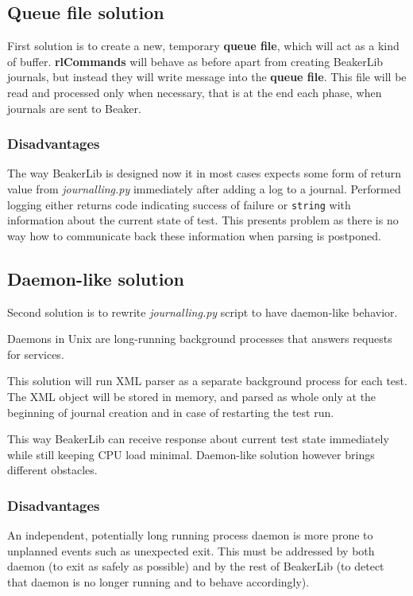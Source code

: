 \subsection{Queue file solution}
First solution is to create a new, temporary \textbf{queue file}, which will act as a kind of buffer. \mbox{\textbf{rlCommands}} will behave as before apart from creating BeakerLib journals, but instead they will write message into the \textbf{queue file}. This file will be read and processed only when necessary, that is at the end each phase, when journals are sent to Beaker.

\subsubsection{Disadvantages}
The way BeakerLib is designed now it in most cases expects some form of return value from \textit{journalling.py} immediately after adding a log to a journal. Performed logging either returns code indicating success of failure or \texttt{string} with information about the current state of test. This presents problem as there is no way how to communicate back these information when parsing is postponed. 

\subsection{Daemon-like solution}
Second solution is to rewrite \textit{journalling.py} script to have daemon-like behavior. 

Daemons in Unix are long-running background processes that answers requests for services\cite{daemon_explanation}.

This solution will run XML parser as a separate background process for each test. The XML object will be stored in memory, and parsed as whole only at the beginning of journal creation and in case of restarting the test run.  

This way BeakerLib can receive response about current test state immediately while still keeping CPU load minimal. Daemon-like solution however brings different obstacles.

\subsubsection{Disadvantages}
An independent, potentially long running process daemon is more prone to unplanned events such as unexpected exit. This must be addressed by both daemon (to exit as safely as possible)  and by the rest of BeakerLib (to detect that daemon is no longer running and to behave accordingly). 

